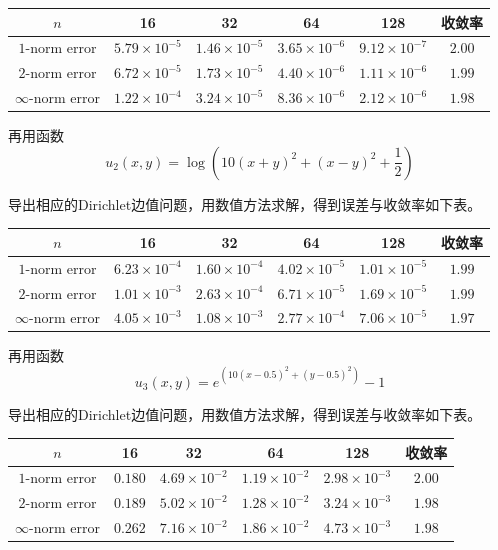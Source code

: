 \documentclass[lang=cn,11pt,a4paper]{elegantpaper}
\begin{document}
\begin{table}[H]
  \centering
  \begin{tabular}{c|cccc|c}
  \textbf{$n$}        & 16                   & 32                   & 64                   & 128                  & 收敛率 \\ \hline
  $1$-norm error      & $5.79\times 10^{-5}$ & $1.46\times 10^{-5}$ & $3.65\times 10^{-6}$ & $9.12\times 10^{-7}$ & $2.00$\\
  $2$-norm error      & $6.72\times 10^{-5}$ & $1.73\times 10^{-5}$ & $4.40\times 10^{-6}$ & $1.11\times 10^{-6}$ & $1.99$\\
  $\infty$-norm error & $1.22\times 10^{-4}$ & $3.24\times 10^{-5}$ & $8.36\times 10^{-6}$ & $2.12\times 10^{-6}$ & $1.98$
  \end{tabular}
\end{table}

再用函数
\begin{equation}
  u_2(x,y)=\log\left(10(x+y)^2+(x-y)^2+\frac{1}{2}\right)
\end{equation}

导出相应的Dirichlet边值问题，用数值方法求解，得到误差与收敛率如下表。

\begin{table}[H]
  \centering
  \begin{tabular}{c|cccc|c}
  \textbf{$n$}        & 16                   & 32                   & 64                   & 128                  & 收敛率 \\ \hline
  $1$-norm error      & $6.23\times 10^{-4}$ & $1.60\times 10^{-4}$ & $4.02\times 10^{-5}$ & $1.01\times 10^{-5}$ & $1.99$\\
  $2$-norm error      & $1.01\times 10^{-3}$ & $2.63\times 10^{-4}$ & $6.71\times 10^{-5}$ & $1.69\times 10^{-5}$ & $1.99$\\
  $\infty$-norm error & $4.05\times 10^{-3}$ & $1.08\times 10^{-3}$ & $2.77\times 10^{-4}$ & $7.06\times 10^{-5}$ & $1.97$
  \end{tabular}
\end{table}

再用函数
\begin{equation}
  u_3(x,y)=e^{\left( 10(x-0.5)^2+(y-0.5)^2 \right)}-1
\end{equation}

导出相应的Dirichlet边值问题，用数值方法求解，得到误差与收敛率如下表。

\begin{table}[H]
  \centering
  \begin{tabular}{c|cccc|c}
  \textbf{$n$}        & 16                   & 32                   & 64                   & 128                  & 收敛率 \\ \hline
  $1$-norm error      & $0.180$ & $4.69\times 10^{-2}$ & $1.19\times 10^{-2}$ & $2.98\times 10^{-3}$ & $2.00$\\
  $2$-norm error      & $0.189$ & $5.02\times 10^{-2}$ & $1.28\times 10^{-2}$ & $3.24\times 10^{-3}$ & $1.98$\\
  $\infty$-norm error & $0.262$ & $7.16\times 10^{-2}$ & $1.86\times 10^{-2}$ & $4.73\times 10^{-3}$ & $1.98$
  \end{tabular}
\end{table}
\end{document}
